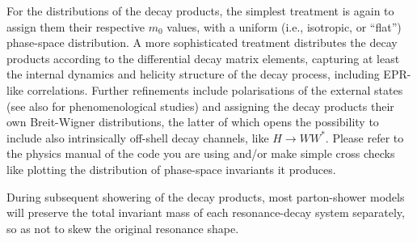 For the distributions of the decay products, the simplest treatment is
again to assign them their respective $m_0$ values, with a uniform
(i.e., isotropic, or ``flat'')
phase-space distribution. A more sophisticated treatment distributes
the decay products according to the differential decay matrix
elements, capturing at least the internal dynamics and helicity
structure of the decay process, including EPR-like correlations. 
%
Further refinements include polarisations of the external 
states~\cite{Collins:1987cp,Knowles:1988vs,Richardson:2001df} (see
also \cite{Stelzer:1995gc,Parke:1996pr,Smillie:2005ar} 
for phenomenological studies)
 and assigning the decay products their own
Breit-Wigner distributions, the latter of which 
opens the possibility to  include also intrinsically off-shell decay
channels, like $H\to W W^*$. Please refer to the physics manual of the
code you are using and/or make simple cross checks like plotting the
distribution of phase-space invariants it produces.

%
During  subsequent showering of the decay products, 
most parton-shower models will preserve the total invariant 
mass of each resonance-decay system separately, 
so as not to skew the original resonance shape.


